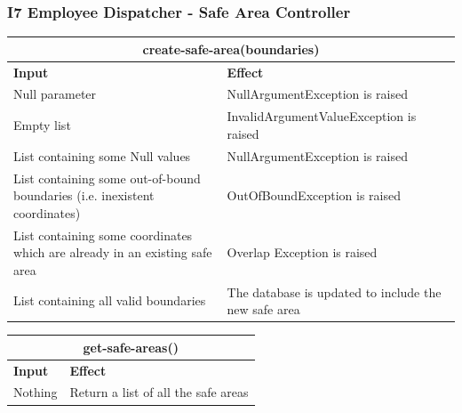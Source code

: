 \documentclass{article}
\begin{document}
\subsubsection{I7 Employee Dispatcher - Safe Area Controller}
\begin{tabular}{ |p{5cm}|p{7cm}| }
  \hline
  \multicolumn{2}{|c|}{create-safe-area(boundaries)} \\
  \hline
  \textbf{Input} & \textbf{Effect} \\
  \hline
  Null parameter & NullArgumentException is raised\\
  \hline
  Empty list & InvalidArgumentValueException is raised\\
  \hline
  List containing some Null values & NullArgumentException is raised\\
  \hline
  List containing some out-of-bound boundaries (i.e. inexistent coordinates) & OutOfBoundException is raised\\
  \hline
  List containing some coordinates which are already in an existing safe area & Overlap Exception is raised\\
  \hline
  List containing all valid boundaries & The database is updated to include the new safe area\\
  \hline
\end{tabular}
\newline
\begin{tabular}{ |p{5cm}|p{7cm}| }
  \hline
  \multicolumn{2}{|c|}{get-safe-areas()} \\
  \hline
  \textbf{Input} & \textbf{Effect} \\
  \hline
  Nothing & Return a list of all the safe areas\\
  \hline
\end{tabular}
\end{document}
